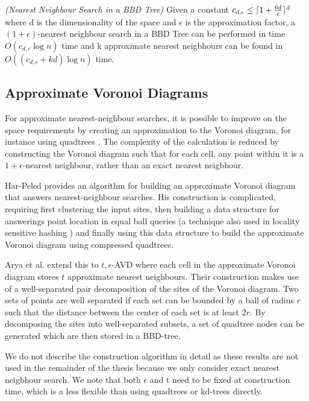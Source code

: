\documentclass[mcs]{scsthesis}
\begin{document}
\begin{thm} \emph{(Nearest Neighbour Search in a BBD Tree)} 
Given a constant \(c_{d,\epsilon} \le \lceil 1 + {6d \over \epsilon} \rceil^d\)
where d is the dimensionality of the space and \(\epsilon\) is the approximation
factor, a \((1 + \epsilon)\)-nearest neighbour search in a BBD Tree can be
performed in time \(O(c_{d,\epsilon} \log n)\) time and k approximate nearest
neigbhours can be found in \(O((c_{d,\epsilon} + kd) \log n)\) time.
\end{thm}

\subsection{Approximate Voronoi Diagrams}

For approximate nearest-neighbour searches, it is possible to improve on the
space requirements by creating an approximation to the Voronoi diagram, for
instance using quadtrees \cite{avd}. The complexity of the calculation is
reduced by constructing the Voronoi diagram such that for each cell, any point
within it is a \(1 + \epsilon\)-nearest neighbour, rather than an exact
nearest neigbhour.

Har-Peled \cite{avd} provides an algorithm for building an approximate
Voronoi diagram that answers nearest-neighbour searches. His construction is
complicated, requiring first clustering the input sites, then
building a data structure for answerings point location in equal ball queries
(a technique also used in locality sensitive hashing \cite{lsh}) and finally
using this data structure to build the approximate Voronoi diagram using
compressed quadtrees.

Arya et al. \cite{arya-avd} extend this to \(t, \epsilon\)-AVD where each
cell in the approximate Voronoi diagram stores \(t\) approximate nearest
neighbours. Their construction makes use of a well-separated pair
decomposition of the sites of the Voronoi diagram. Two sets of points are well
separated if each set can be bounded by a ball of radius \(r\) such that the
distance between the center of each set is at least \(2r\). By decomposing
the sites into well-separated subsets, a set of quadtree nodes can be
generated which are then stored in a BBD-tree. 

We do not describe the construction algorithm in detail as these results are
not used in the remainder of the thesis because we only consider exact
nearest neigbhour search. We note that both \(\epsilon\) and t need to be fixed
at construction time, which is a less flexible than using quadtrees or
kd-trees directly.
\end{document}
